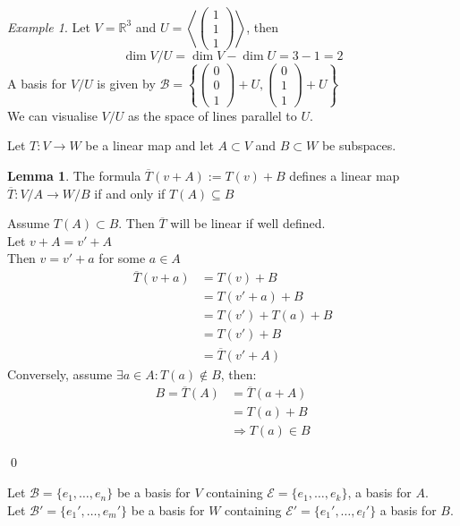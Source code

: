 \documentclass[11pt, a4paper]{report}
\makeatletter
\numberwithin{equation}{section}
\newcommand{\R}{\mathbb{R}}
\newcommand{\spn}[1]{\left\langle #1 \right\rangle}
\newcommand{\nin}{\not\in}
\newcommand{\smp}[1]{\left(\begin{smallmatrix}#1\end{smallmatrix}\right)}
\numberwithin{equation}{subsection}
\theoremstyle{plain}
\theoremstyle{definition}
\newtheorem{lem}[thm]{Lemma}
\theoremstyle{remark}
\newtheorem{exmp}{Example}[chapter]
\newtheorem*{prf}{Proof}
\renewenvironment{prf}[1][\proofname]{\par
  \vspace{-\topsep}%
  \normalfont
  \topsep0pt \partopsep0pt %
  \trivlist
  \item[\hskip\labelsep
        \itshape
    #1\@addpunct{.}]\ignorespaces
}{%
  \popQED\endtrivlist\@endpefalse
  \addvspace{6pt plus 6pt} %
}
\newcommand{\pr}[1]{\begin{adjustwidth}{1cm}{} \begin{prf} #1 \end{prf} \end{adjustwidth}}
\makeatother
\begin{document}
\begin{exmp} Let $V = \R^3$ and $U = \spn{\smp{1\\1\\1}}$, then $$\dim V/U = \dim V - \dim U = 3 - 1 = 2$$
A basis for $V/U$ is given by $\mathcal{B} = \left\{ \smp{0\\0\\1} + U, \smp{0\\1\\1} + U \right\}$\\ We can visualise $V/U$ as the space of lines parallel to $U$. \end{exmp}

Let $T: V \to W$ be a linear map and let $A \subset V$ and $B \subset W$ be subspaces.

\begin{lem} The formula $\overline{T}(v + A) := T(v) + B$ defines a linear map $\overline{T} : V/A \to W/B$ if and only if $T(A) \subseteq B$ \end{lem}

\pr{
Assume $T(A) \subset B$. Then $\overline{T}$ will be linear if well defined.\\ Let $v + A = v' + A$\\ Then $v = v' + a$ for some $a \in A$
\begin{align*}
\overline{T}(v + a)		&= T(v) + B\\
						&= T(v' + a) + B\\
						&= T(v') + T(a) + B\\
						&= T(v') + B \tag{$T(a) \in B$}\\
						&= \overline{T}(v' + A)
\end{align*}
Conversely, assume $\exists a \in A : T(a) \nin B$, then:
\begin{align*}
B = \overline{T}(A) 	&= \overline{T}(a + A)\\
						&= T(a) + B\\
						&\Rightarrow T(a) \in B \tag{CONTRADICTION}
\end{align*}
}\qed

Let $\mathcal{B} = \{ e_1, \ldots, e_n \}$ be a basis for $V$ containing $\mathcal{E} = \{ e_1, \ldots, e_k \}$, a basis for $A$.\\
Let $\mathcal{B'} = \{ e_1', \ldots, e_m' \}$ be a basis for $W$ containing $\mathcal{E'} = \{ e_1', \ldots, e_l' \}$ a basis for $B$.\\
\end{document}
